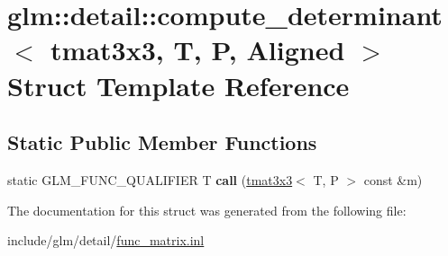 \hypertarget{structglm_1_1detail_1_1compute__determinant_3_01tmat3x3_00_01T_00_01P_00_01Aligned_01_4}{}\section{glm\+:\+:detail\+:\+:compute\+\_\+determinant$<$ tmat3x3, T, P, Aligned $>$ Struct Template Reference}
\label{structglm_1_1detail_1_1compute__determinant_3_01tmat3x3_00_01T_00_01P_00_01Aligned_01_4}
\subsection*{Static Public Member Functions}
\begin{DoxyCompactItemize}
\item 
\mbox{\label{structglm_1_1detail_1_1compute__determinant_3_01tmat3x3_00_01T_00_01P_00_01Aligned_01_4_a0405cf47c521799f9581b5e9547a7882}} 
static G\+L\+M\+\_\+\+F\+U\+N\+C\+\_\+\+Q\+U\+A\+L\+I\+F\+I\+ER T {\bfseries call} (\hyperlink{structglm_1_1tmat3x3}{tmat3x3}$<$ T, P $>$ const \&m)
\end{DoxyCompactItemize}


The documentation for this struct was generated from the following file\+:\begin{DoxyCompactItemize}
\item 
include/glm/detail/\hyperlink{func__matrix_8inl}{func\+\_\+matrix.\+inl}\end{DoxyCompactItemize}

